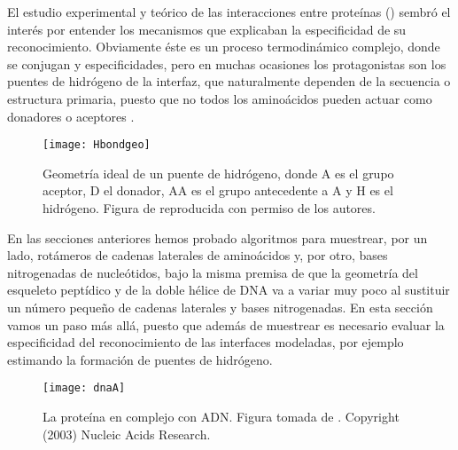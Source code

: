 El estudio experimental y te\'{o}rico de las interacciones entre prote\'{i}nas 
()
sembr\'{o} el inter\'{e}s por entender los mecanismos que explicaban la especificidad de su reconocimiento.
Obviamente \'{e}ste es un proceso termodin\'{a}mico complejo, donde se conjugan 
 y especificidades, pero en muchas ocasiones los 
protagonistas son los puentes de hidr\'{o}geno de la interfaz, que naturalmente dependen de la secuencia o estructura primaria, 
puesto que no todos los amino\'{a}cidos pueden actuar como donadores o aceptores \citep{Kortemme2003}.

\begin{figure}
\begin{center} 
\texttt{[image: Hbondgeo]}
\caption%
{
Geometr\'{i}a ideal de un puente de hidr\'{o}geno, donde A es el grupo aceptor, D el donador,
AA es el grupo antecedente a A y H es el hidr\'{o}geno.
Figura de \citet{McDonald1994} reproducida con permiso de los autores.
}
\label{fig:Hbondgeo}
\end{center}
\end{figure}

En las secciones anteriores hemos probado algoritmos para muestrear, por un lado, rot\'{a}meros de cadenas laterales 
de amino\'{a}cidos y, por otro, bases nitrogenadas de nucle\'{o}tidos, bajo la misma premisa de que la geometr\'{i}a 
del esqueleto pept\'{i}dico y de la doble h\'{e}lice de DNA va a variar muy poco al sustituir un n\'{u}mero peque\~no 
de cadenas laterales y bases nitrogenadas. En esta secci\'{o}n vamos un paso m\'{a}s all\'{a}, puesto 
que adem\'{a}s de muestrear es necesario evaluar la especificidad del reconocimiento de las interfaces modeladas, 
por ejemplo estimando la formaci\'{o}n de puentes de hidr\'{o}geno.

\begin{figure}
\begin{center} 
\texttt{[image: dnaA]}
\caption%
{
La prote\'{i}na  en complejo 
con ADN. Figura tomada de \cite{Fujikawa2003}. Copyright (2003) Nucleic Acids Research.
}
\label{fig:dnaA}
\end{center}
\end{figure} %

